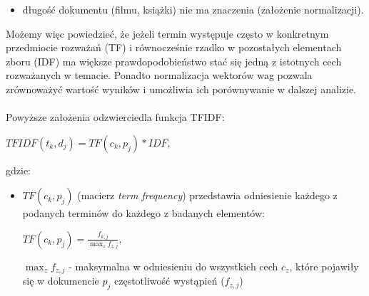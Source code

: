 \documentclass[12pt,a4paper]{report}
\begin{document}
\begin{enumerate}
\begin{itemize}
\item długość dokumentu (filmu, książki) nie ma znaczenia (założenie normalizacji).  
\end{itemize}
Możemy więc powiedzieć, że jeżeli termin występuje często w konkretnym przedmiocie rozważań (TF) i równocześnie rzadko w pozostałych elementach zboru (IDF) ma większe prawdopodobieństwo stać się jedną z istotnych cech rozważanych w temacie. Ponadto normalizacja wektorów wag pozwala zrównoważyć wartość wyników i umożliwia ich porównywanie w dalszej analizie.
\\
\\Powyższe założenia odzwierciedla funkcja TFIDF:
\begin{center}
\begin{math}
TFIDF(t_k, d_j) = TF(c_k, p_j) * IDF,
\end{math}
\end{center}
gdzie:
\begin{itemize}
\item \begin{math}TF(c_k, p_j)  \end{math} (macierz \textit{term frequency}) przedstawia odniesienie każdego z podanych terminów do każdego z badanych elementów:
\begin{center}
\begin{math}
TF(c_k, p_j)=\frac{f_{k,j}}{\max_{z}f_{z,j}},
\end{math}
\end{center}
$\max_{z}f_{z,j}$ - maksymalna w odniesieniu do wszystkich cech $c_z$, które pojawiły się w dokumencie $p_j$ częstotliwość wystąpień ($f_{z,j}$) 


\end{itemize}
\end{enumerate}
\end{document}
